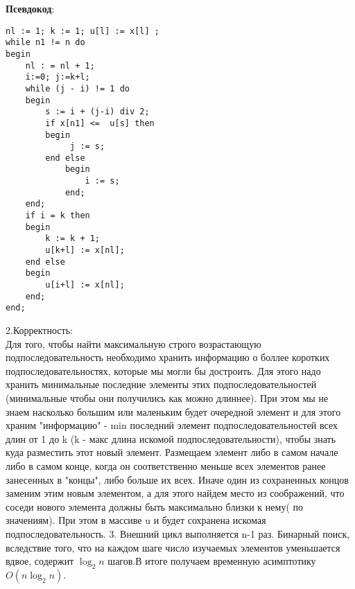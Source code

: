 \documentclass[a4paper,12pt]{article} %
\begin{document}
\hspace{100pt} \textbf{Псевдокод}:

\begin{lstlisting}
nl := 1; k := 1; u[l] := x[l] ;
while n1 != n do 
begin
	nl : = nl + 1;
	i:=0; j:=k+l;
	while (j - i) != 1 do 
	begin
		s := i + (j-i) div 2;
		if x[n1] <=  u[s] then 
		begin
			 j := s;
		end else 
			begin 
				i := s;
			end;
	end;
	if i = k then 
	begin
		k := k + 1;
		u[k+l] := x[nl];
	end else 
	begin 
		u[i+l] := x[nl];
	end;
end;
\end{lstlisting}
2.Корректность:\\
Для того, чтобы найти максимальную строго возрастающую подпоследовательность необходимо хранить информацию о боллее коротких подпоследовательностях, которые мы могли бы достроить. Для этого надо хранить минимальные последние элементы этих подпоследовательностей (минимальные чтобы они получились как можно длиннее). При этом мы не знаем насколько большим или маленьким будет очередной элемент и для этого храним "информацию" - min последний элемент подпоследовательностей всех длин от 1 до k (k - макс длина искомой подпоследовательности), чтобы знать куда разместить этот новый элемент. Размещаем элемент либо в самом начале либо в самом конце, когда он соответственно меньше всех элементов ранее занесенных в "концы", либо больше их всех. Иначе один из сохраненных концов заменим этим новым элементом, а для этого найдем место из соображений, что соседи нового элемента должны быть максимально близки к нему( по значениям). При этом в массиве u и будет сохранена искомая подпоследовательность.
3. Внешний цикл выполняется n-1 раз. Бинарный поиск, вследствие того, что на каждом шаге число изучаемых элементов уменьшается вдвое, содержит $ \log_{2}{n}$ шагов.В итоге получаем временную асимптотику $O(n\log_{2}{n}).$
\end{document}
